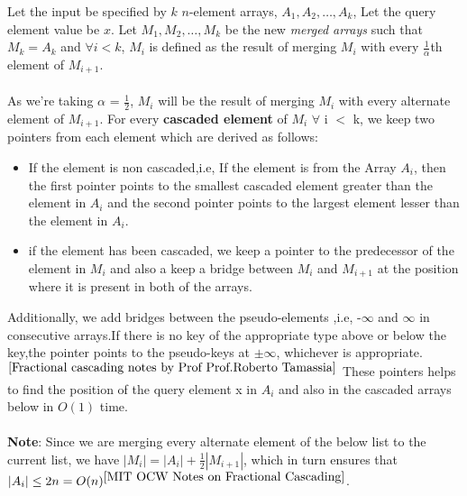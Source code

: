 \documentclass[11pt]{article}
\begin{document}
Let the input be specified by $k$ $n$-element arrays, $A_1,A_2,\dots,A_k$, Let the query element value be $x$.
Let $M_1,M_2,\dots,M_k$ be the new \textit{merged arrays} such that $M_k = A_k$ and $\forall i < k$, $M_i$ is defined as the result of merging $M_i$ with every $\frac{1}{\alpha}$th element of $M_{i+1}$. \\ \\
As we're taking $\alpha$ = $\frac{1}{2}$, $M_i$ will be the result of merging $M_i$ with every alternate element of $M_{i+1}$. For every \textbf{cascaded element} of $M_i$ $\forall$ i $<$ k, we keep two pointers from each element which are derived as follows:
\begin{itemize}
    \item If the element is non cascaded,i.e, If the element is from the Array $A_i$, then the first pointer points to the smallest cascaded element greater than the element in $A_i$ and the second pointer points to the largest element lesser than the element in $A_i$. 
 
    \item if the element has been cascaded, we keep a pointer to the predecessor of the element in $M_i$ and also a keep a bridge between $M_i$ and $M_{i+1}$ at the position where it is present in both of the arrays.
\end{itemize}
Additionally, we add bridges between the pseudo-elements ,i.e,  -$\infty$ and $\infty$ in consecutive arrays.If there is no key of the appropriate type above or below the key,the pointer points to the pseudo-keys at $\pm \infty$, whichever is appropriate.$^{\cite{Fractional cascading notes by Prof Prof.Roberto Tamassia}}$
These pointers helps to find the position of the query element x in $A_i$ and also in the cascaded arrays below in $O(1)$ time. \\ \\
\textbf{Note}: Since we are merging every alternate element of the below list to the current list, we have 
$|M_i| = |A_i| +\frac{1}{2}|M_{i+1}|$, which in turn ensures that $|A_i| \leq 2n = O(n) ^{\cite{MIT OCW Notes on Fractional Cascading}}$. \\
\end{document}

